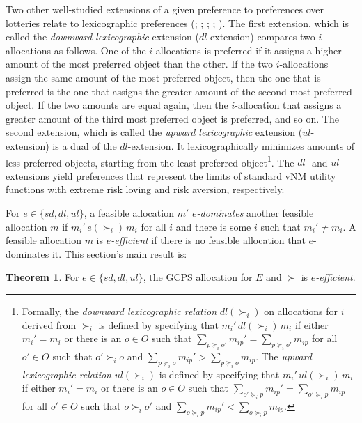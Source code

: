 \documentclass[12pt, A4paper]{article}
\theoremstyle{definition}
\newtheorem{thm}{Theorem}
\begin{document}
Two other well-studied extensions of a given preference to preferences over lotteries relate to lexicographic preferences (\citealp{cho16geb}; \citealp{sv15wp}; \citealp{cd16}; \citealp{ss14jme}; \citealp{cho18scw}). The first extension, which is called the \emph{downward lexicographic} extension ($dl$-extension) compares two $i$-allocations as follows. One of the $i$-allocations is preferred if it assigns a higher amount of the most preferred object than the other. If the two $i$-allocations assign the same amount of the most preferred object, then the one that is preferred is the one that assigns the greater amount of the second most preferred object. If the two amounts are equal again, then the $i$-allocation that assigns a greater amount of the third most preferred object is preferred, and so on.
The second extension, which is called the \emph{upward lexicographic} extension ($ul$-extension) is a dual of the $dl$-extension. It lexicographically minimizes amounts of less preferred objects, starting from the least preferred object\footnote{ 
Formally, the \emph{downward lexicographic relation} ${dl}(\succ_i)$ on allocations for $i$ derived from $\succ_i$ is defined by specifying that $m_i' \, {dl}(\succ_i) \, m_i$ if  either $m_i' = m_i$ or there is an $o \in O$ such that $\sum_{p \succeq_i o'} m_{ip}' = \sum_{p \succeq_i o'} m_{ip}$ for all $o' \in O$ such that $o' \succ_i o$ and $\sum_{p \succeq_i o} m_{ip}' > \sum_{p \succeq_i o} m_{ip}$.   The \emph{upward lexicographic relation} ${ul}(\succ_i)$ is defined by specifying that $m_i' \, {ul}(\succ_i) \, m_i$ if  either $m_i' = m_i$ or there is an $o \in O$ such that $\sum_{o' \succeq_i p} m_{ip}' = \sum_{o' \succeq_i p} m_{ip}$ for all $o' \in O$ such that $o \succ_i o'$ and $\sum_{o \succeq_i p} m_{ip}' < \sum_{o \succeq_i p} m_{ip}$.
}.  The $dl$- and $ul$-extensions yield preferences that represent the limits of standard vNM utility functions with extreme risk loving and risk aversion, respectively.

For $e \in \{sd,dl,ul\}$, a feasible allocation $m'$ \emph{$e$-dominates} another feasible allocation $m$ if $m_i' \, e(\succ_i) \, m_i$ for all $i$ and there is some $i$ such that $m_i' \ne m_i$.  A feasible allocation $m$ is \emph{$e$-efficient} if there is no feasible allocation that $e$-dominates it.  This section's main result is:

\begin{thm}\label{th:axiom_topdown}
For $e \in \{sd,dl,ul\}$, the GCPS allocation for $E$ and $\succ$ is \emph{$e$-efficient}.  
\end{thm}
\end{document}
